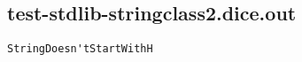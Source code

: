 \subsection{test-stdlib-stringclass2.dice.out}
\begin{verbatim}
StringDoesn'tStartWithH
\end{verbatim}